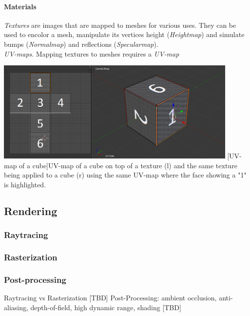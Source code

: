 \paragraph{Materials} \textit{Textures} are images that are mapped to meshes for various uses. They can be used to encolor a mesh, manipulate its vertices height (\textit{Heightmap})\cite{UnityDocHeightmap} and simulate bumps (\textit{Normalmap}\cite{UnityDocNormalmap}\cite{Cohen:1998:AS:280814.280832}\cite{745285}) and reflections (\textit{Specularmap})\cite{UnityDocSpecularmap}.\\
\textit{UV-maps}.
Mapping textures to meshes requires a \textit{UV-map}

\begin{center}
\noindent\includegraphics[width=12cm]{tex/img/ch03/CubeUVMapping.png}
[UV-map of a cube]{UV-map of a cube on top of a texture (l) and the same texture being applied to a cube (r) using the same UV-map where the face showing a "1" is highlighted.}
\label{fig:3d-cube-uv-mapping}
\end{center}

\subsection{Rendering}
\subsubsection{Raytracing}
\subsubsection{Rasterization}
\subsubsection{Post-processing}
Raytracing \cite{Plemenos2010} vs Rasterization [TBD]
Post-Processing: ambient occlusion, anti-aliasing, depth-of-field, high dynamic range, shading [TBD]

